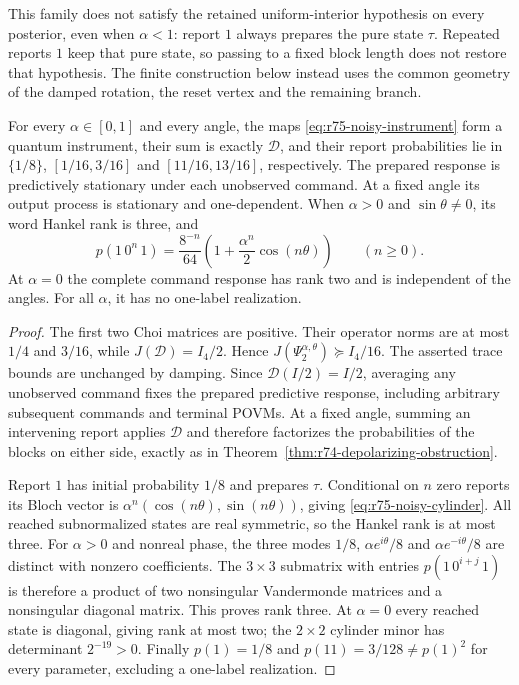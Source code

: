 This family does not satisfy the retained uniform-interior hypothesis
on every posterior, even when $\alpha<1$: report $1$ always prepares the
pure state $\tau$.  Repeated reports $1$ keep that pure state, so passing
to a fixed block length does not restore that hypothesis.  The finite
construction below instead uses the common geometry of the damped
rotation, the reset vertex and the remaining branch.

\begin{lemma}
\label{lem:r75-noisy-physical}
For every $\alpha\in[0,1]$ and every angle, the maps
\eqref{eq:r75-noisy-instrument} form a quantum instrument, their sum is
exactly $\mathcal D$, and their report probabilities lie in
$\{1/8\}$, $[1/16,3/16]$ and $[11/16,13/16]$, respectively.
The prepared response is predictively stationary under each unobserved
command.  At a fixed angle its output process is stationary and
one-dependent.  When $\alpha>0$ and $\sin\theta\ne0$, its word Hankel rank
is three, and
\begin{equation}\label{eq:r75-noisy-cylinder}
 p(1\,0^n\,1)=\frac{8^{-n}}{64}
           \left(1+\frac{\alpha^n}{2}\cos(n\theta)\right)
 \qquad(n\ge0).
\end{equation}
At $\alpha=0$ the complete command response has rank two and is independent
of the angles.  For all $\alpha$, it has no one-label realization.
\end{lemma}
\begin{proof}
The first two Choi matrices are positive.  Their operator norms are at
most $1/4$ and $3/16$, while $J(\mathcal D)=I_4/2$.  Hence
$J(\Psi^{\alpha,\theta}_2)\succeq I_4/16$.  The asserted trace bounds
are unchanged by damping.  Since $\mathcal D(I/2)=I/2$, averaging any
unobserved command fixes the prepared predictive response, including
arbitrary subsequent commands and terminal POVMs.  At a fixed angle,
summing an intervening report applies $\mathcal D$ and therefore
factorizes the probabilities of the blocks on either side, exactly as in
Theorem~\ref{thm:r74-depolarizing-obstruction}.

Report $1$ has initial probability $1/8$ and prepares $\tau$.  Conditional
on $n$ zero reports its Bloch vector is
$\alpha^n(\cos(n\theta),\sin(n\theta))$, giving
\eqref{eq:r75-noisy-cylinder}.  All reached subnormalized states are real
symmetric, so the Hankel rank is at most three.  For $\alpha>0$ and
nonreal phase, the three modes $1/8$, $\alpha e^{i\theta}/8$ and
$\alpha e^{-i\theta}/8$ are distinct with nonzero coefficients.  The
$3\times3$ submatrix with entries $p(1\,0^{i+j}\,1)$ is therefore a
product of two nonsingular Vandermonde matrices and a nonsingular
diagonal matrix.  This proves rank three.
At $\alpha=0$ every reached state is diagonal, giving rank at most two;
the $2\times2$ cylinder minor has determinant $2^{-19}>0$.
Finally $p(1)=1/8$ and $p(11)=3/128\ne p(1)^2$ for every parameter,
excluding a one-label realization.
\end{proof}

